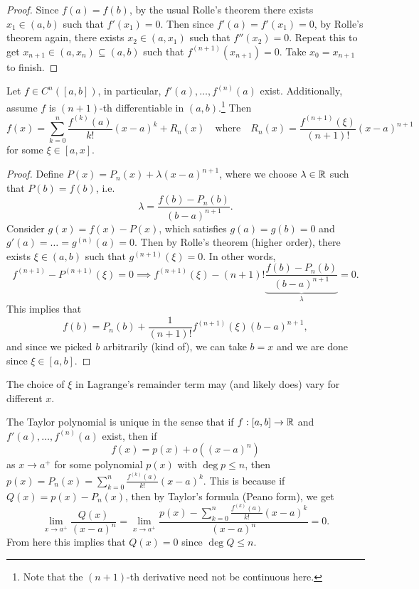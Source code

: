 \begin{proof}
  Since $f(a) = f(b)$, by the usual Rolle's theorem
  there exists $x_1 \in (a, b)$ such that $f'(x_1) = 0$.
  Then since $f'(a) = f'(x_1) = 0$, by
  Rolle's theorem again,
  there exists $x_2 \in (a, x_1)$ such that $f''(x_2) = 0$.
  Repeat this to get $x_{n + 1} \in (a, x_n) \subseteq (a, b)$ such that
  $f^{(n + 1)}(x_{n + 1}) = 0$. Take $x_0 = x_{n + 1}$
  to finish.
\end{proof}

\begin{theorem}
  Let $f \in C^n([a, b])$, in particular,
  $f'(a), \dots, f^{(n)}(a)$ exist. Additionally,
  assume $f$ is $(n + 1)$-th differentiable in $(a, b)$.\footnote{Note that the $(n + 1)$-th derivative need not be continuous here.}
  Then
  \[
    f(x) = \sum_{k = 0}^n \frac{f^{(k)}(a)}{k!}(x - a)^k + R_n(x) \quad \text{where} \quad R_n(x) = \frac{f^{(n + 1)}(\xi)}{(n + 1)!}(x - a)^{n + 1}
  \]
  for some $\xi \in [a, x]$.
\end{theorem}

\begin{proof}
  Define $P(x) = P_n(x) + \lambda (x - a)^{n + 1}$, where
  we choose $\lambda \in \mathbb{R}$ such that $P(b) = f(b)$, i.e.
  \[
    \lambda = \frac{f(b) - P_n(b)}{(b - a)^{n + 1}}.
  \]
  Consider $g(x)  = f(x) - P(x)$, which satisfies
  $g(a) = g(b) = 0$ and $g'(a) = \dots = g^{(n)}(a) = 0$.
  Then by Rolle's theorem (higher order), there exists
  $\xi \in (a, b)$ such that $g^{(n + 1)}(\xi) = 0$.
  In other words,
  \[
    f^{(n + 1)} - P^{(n + 1)}(\xi) = 0
    \implies f^{(n + 1)}(\xi) - (n + 1)! \underbrace{\frac{f(b) - P_n(b)}{(b - a)^{n + 1}}}_{\lambda} = 0.
  \]
  This implies that
  \[
    f(b) = P_n(b) + \frac{1}{(n + 1)!} f^{(n + 1)}(\xi) (b - a)^{n + 1},
  \]
  and since we picked $b$ arbitrarily (kind of),
  we can take $b = x$ and we are done since
  $\xi \in [a, b]$.
\end{proof}

\begin{remark}
  The choice of $\xi$ in Lagrange's remainder term
  may (and likely does) vary for different $x$.
\end{remark}

\begin{remark}
  The Taylor polynomial is unique in the sense that
  if $f : [a, b] \to \mathbb{R}$ and $f'(a), \dots, f^{(n)}(a)$
  exist, then if
  \[f(x) = p(x) + o((x - a)^n)\]
  as $x \to a^+$ for some polynomial $p(x)$ with
  $\deg p \le n$, then
  $p(x) = P_n(x) = \sum_{k = 0}^n \frac{f^{(k)}(a)}{k!} (x - a)^k$.
  This is because if $Q(x) = p(x) - P_n(x)$, then
  by Taylor's formula (Peano form), we get
  \[
    \lim_{x \to a^+} \frac{Q(x)}{(x - a)^n}
    = \lim_{x \to a^+} \frac{p(x) - \sum_{k = 0}^n \frac{f^{(k)}(a)}{k!} (x - a)^k}{(x - a)^n} = 0.
  \]
  From here this implies that $Q(x) = 0$ since $\deg Q \le n$.
\end{remark}
